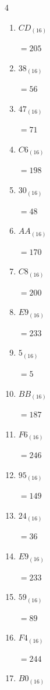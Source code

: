 \begin{multicols}{4}
\begin{enumerate}
  \item $CD_{(16)}$

        $=205$

  \item $38_{(16)}$

        $=56$

  \item $47_{(16)}$

        $=71$

  \item $C6_{(16)}$

        $=198$

  \item $30_{(16)}$

        $=48$

  \item $AA_{(16)}$

        $=170$

  \item $C8_{(16)}$

        $=200$

  \item $E9_{(16)}$

        $=233$

  \item $5_{(16)}$

        $=5$

  \item $BB_{(16)}$

        $=187$

  \item $F6_{(16)}$

        $=246$

\columnbreak %

  \item $95_{(16)}$

        $=149$

  \item $24_{(16)}$

        $=36$

  \item $E9_{(16)}$

        $=233$

  \item $59_{(16)}$

        $=89$

  \item $F4_{(16)}$

        $=244$

  \item $B0_{(16)}$


\end{enumerate}
\end{multicols}
